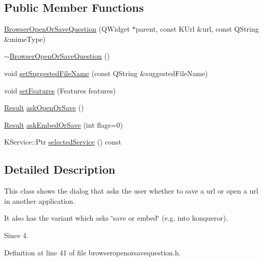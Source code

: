 \subsection*{\-Public \-Member \-Functions}
\begin{DoxyCompactItemize}
\item 
\hyperlink{classKParts_1_1BrowserOpenOrSaveQuestion_a93097e04518164345d399f7c376b993e}{\-Browser\-Open\-Or\-Save\-Question} (\-Q\-Widget $\ast$parent, const \-K\-Url \&url, const \-Q\-String \&mime\-Type)
\item 
\hyperlink{classKParts_1_1BrowserOpenOrSaveQuestion_a6af2b8e427bf2bb922bb9fcc09df6a65}{$\sim$\-Browser\-Open\-Or\-Save\-Question} ()
\item 
void \hyperlink{classKParts_1_1BrowserOpenOrSaveQuestion_a82733c7818b3c6ee5987ee8c7450c29f}{set\-Suggested\-File\-Name} (const \-Q\-String \&suggested\-File\-Name)
\item 
void \hyperlink{classKParts_1_1BrowserOpenOrSaveQuestion_a998acfa7caa8a47794cc0eb2682a503d}{set\-Features} (\-Features features)
\item 
\hyperlink{classKParts_1_1BrowserOpenOrSaveQuestion_a12842198b7684e9e246e9a207eabc93f}{\-Result} \hyperlink{classKParts_1_1BrowserOpenOrSaveQuestion_a5d9df0d831477073f43071dfe580456d}{ask\-Open\-Or\-Save} ()
\item 
\hyperlink{classKParts_1_1BrowserOpenOrSaveQuestion_a12842198b7684e9e246e9a207eabc93f}{\-Result} \hyperlink{classKParts_1_1BrowserOpenOrSaveQuestion_ad261c14f0e8e32b99b61029fdd5f2fad}{ask\-Embed\-Or\-Save} (int flags=0)
\item 
\-K\-Service\-::\-Ptr \hyperlink{classKParts_1_1BrowserOpenOrSaveQuestion_aaaa2f3a0f18e7acc82152bf296c227da}{selected\-Service} () const 
\end{DoxyCompactItemize}


\subsection{\-Detailed \-Description}
\-This class shows the dialog that asks the user whether to save a url or open a url in another application.

\-It also has the variant which asks \char`\"{}save or embed\char`\"{} (e.\-g. into konqueror).

\begin{DoxySince}{\-Since}
4. 
\end{DoxySince}


\-Definition at line 41 of file browseropenorsavequestion.\-h.



